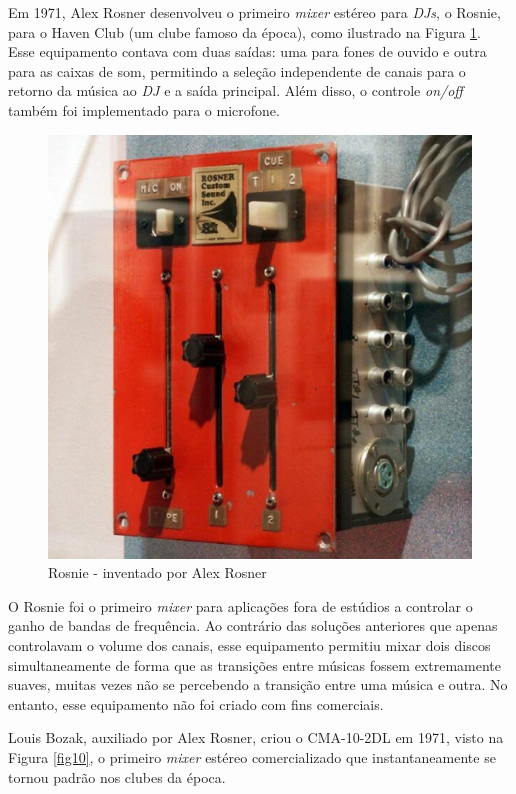 Em 1971, Alex Rosner desenvolveu o primeiro \textit{mixer} estéreo para \textit{DJs}, o Rosnie, para o Haven Club (um clube famoso da época), como ilustrado na Figura \ref{fig08}. Esse equipamento contava com duas saídas: uma para fones de ouvido e outra para as caixas de som, permitindo a seleção independente de canais para o retorno da música ao \textit{DJ} e a saída principal. Além disso, o controle \textit{on/off} também foi implementado para o microfone.

\begin{figure}[h]
	\centering
    \includegraphics[scale=0.4]{figuras/fig08.eps}
	\caption{Rosnie - inventado por Alex Rosner \cite{stoneyroadsStoryBehind}}
	\label{fig08}
\end{figure}

O Rosnie foi o primeiro \textit{mixer} para aplicações fora de estúdios a controlar o ganho de bandas de frequência. Ao contrário das soluções anteriores que apenas controlavam o volume dos canais, esse equipamento permitiu mixar dois discos simultaneamente de forma que as transições entre músicas fossem extremamente suaves, muitas vezes não se percebendo a transição entre uma música e outra. No entanto, esse equipamento não foi criado com fins comerciais.

Louis Bozak, auxiliado por Alex Rosner, criou o CMA-10-2DL em 1971, visto na Figura \ref{fig10}, o primeiro \textit{mixer} estéreo comercializado que instantaneamente se tornou padrão nos clubes da época.


